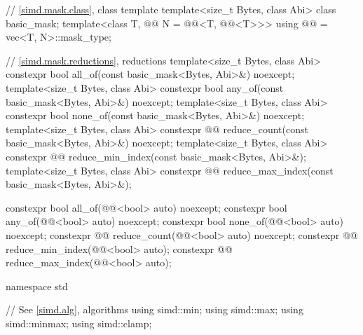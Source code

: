 \begin{codeblock}
{  // \ref{simd.mask.class}, class template 
  template<size_t Bytes, class Abi> class basic_mask;
  template<class T, @@ N = @@<T, @@<T>>>
    using @@ = vec<T, N>::mask_type;

  // \ref{simd.mask.reductions}, reductions
  template<size_t Bytes, class Abi>
    constexpr bool all_of(const basic_mask<Bytes, Abi>&) noexcept;
  template<size_t Bytes, class Abi>
    constexpr bool any_of(const basic_mask<Bytes, Abi>&) noexcept;
  template<size_t Bytes, class Abi>
    constexpr bool none_of(const basic_mask<Bytes, Abi>&) noexcept;
  template<size_t Bytes, class Abi>
    constexpr @@ reduce_count(const basic_mask<Bytes, Abi>&) noexcept;
  template<size_t Bytes, class Abi>
    constexpr @@ reduce_min_index(const basic_mask<Bytes, Abi>&);
  template<size_t Bytes, class Abi>
    constexpr @@ reduce_max_index(const basic_mask<Bytes, Abi>&);

  constexpr bool all_of(@@<bool> auto) noexcept;
  constexpr bool any_of(@@<bool> auto) noexcept;
  constexpr bool none_of(@@<bool> auto) noexcept;
  constexpr @@ reduce_count(@@<bool> auto) noexcept;
  constexpr @@ reduce_min_index(@@<bool> auto);
  constexpr @@ reduce_max_index(@@<bool> auto);
}

namespace std {
  // See \ref{simd.alg}, algorithms
  using simd::min;
  using simd::max;
  using simd::minmax;
  using simd::clamp;

}
\end{codeblock}
